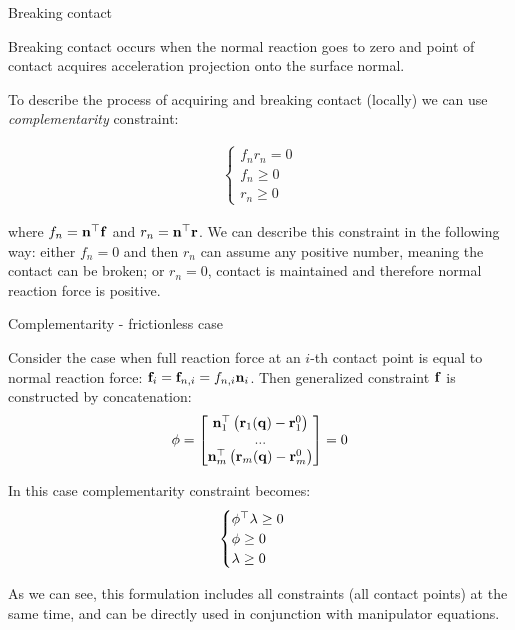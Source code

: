 \documentclass{beamer}
\begin{document}
\begin{frame}{Breaking contact}
	\begin{flushleft}
		
		Breaking contact occurs when the normal reaction goes to zero and point of contact acquires acceleration projection onto the surface normal.
		
		\bigskip
		
		To describe the process of acquiring and breaking contact (locally) we can use \emph{complementarity} constraint:
		
		\begin{align}
			\begin{cases}
				f_n r_n = 0 \\
				f_n \geq 0 \\
				r_n \geq 0
			\end{cases}
		\end{align}
		
		where $f_n = \mathbf{n}^\top\mathbf{f}$ and $r_n =\mathbf{n}^\top\mathbf{r}$. We can describe this constraint in the following way: either $f_n = 0$ and then $r_n$ can assume any positive number, meaning the contact can be broken; or $r_n = 0$, contact is maintained and therefore normal reaction force is positive.
		
	\end{flushleft}
\end{frame}



\begin{frame}{Complementarity - frictionless case}
	\begin{flushleft}
		
		Consider the case when full reaction force at an $i$-th contact point is equal to normal reaction force: $\mathbf{f}_i = \mathbf{f}_{n,i} = f_{n,i} \mathbf{n}_i$. Then generalized constraint $\mathbf{f}$ is constructed by concatenation:
		\begin{align}
			\phi = \begin{bmatrix}
				\mathbf{n}_1^\top \left(\mathbf{r}_1(\mathbf{q}) - \mathbf{r}_1^0 \right) \\
				... \\
				\mathbf{n}_m^\top \left(\mathbf{r}_m(\mathbf{q}) - \mathbf{r}_m^0 \right)
			\end{bmatrix}
		= 0
		\end{align}
		
		In this case complementarity constraint becomes:
		\begin{align}
			\begin{cases}
				\phi^\top \lambda \geq 0 \\
				\phi \geq 0 \\
				\lambda \geq 0
			\end{cases}
		\end{align}
		
		As we can see, this formulation includes all constraints (all contact points) at the same time, and can be directly used in conjunction with manipulator equations.
		
	\end{flushleft}
\end{frame}
\end{document}
